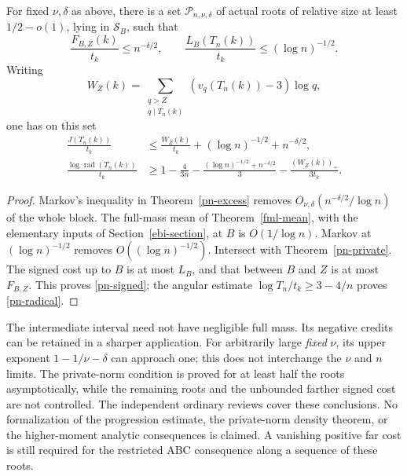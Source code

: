 \begin{corollary}\label{pn-domain}
For fixed \(\nu,\delta\) as above, there is a set
\(\mathcal{P}_{n,\nu,\delta}\) of actual roots of relative size at
least \(1/2-o(1)\), lying in \(\mathcal{S}_B\), such that
\[
 \frac{F_{B,Z}(k)}{t_k}\leq n^{-\delta/2},\qquad
 \frac{L_B(T_n(k))}{t_k}\leq(\log n)^{-1/2}.
\]
Writing
\[
 W_Z(k)=\sum_{\substack{q>Z\\q\mid T_n(k)}}
                         (v_q(T_n(k))-3)\log q,
\]
one has on this set
\begin{align}
 \frac{J(T_n(k))}{t_k}
   &\leq\frac{W_Z(k)}{t_k}+(\log n)^{-1/2}+n^{-\delta/2},
       \label{pn-signed}\\
 \frac{\log\operatorname{rad}(T_n(k))}{t_k}
   &\geq1-\frac4{3n}
       -\frac{(\log n)^{-1/2}+n^{-\delta/2}}3
       -\frac{(W_Z(k))_+}{3t_k}. \label{pn-radical}
\end{align}
\end{corollary}
\begin{proof}
Markov's inequality in Theorem~\ref{pn-excess} removes
\(O_{\nu,\delta}(n^{-\delta/2}/\log n)\) of the whole block.
The full-mass mean of Theorem~\ref{fml-mean}, with the elementary
inputs of Section~\ref{ebi-section}, at \(B\) is \(O(1/\log n)\).
Markov at \((\log n)^{-1/2}\) removes \(O((\log n)^{-1/2})\).
Intersect with Theorem~\ref{pn-private}.
The signed cost up to \(B\) is at most \(L_B\), and that between
\(B\) and \(Z\) is at most \(F_{B,Z}\).
This proves \eqref{pn-signed}; the angular estimate
\(\log T_n/t_k\geq3-4/n\) proves \eqref{pn-radical}.
\end{proof}

The intermediate interval need not have negligible full mass.
Its negative credits can be retained in a sharper application.
For arbitrarily large \emph{fixed} \(\nu\), its upper exponent
\(1-1/\nu-\delta\) can approach one; this does not interchange
the \(\nu\) and \(n\) limits. The private-norm condition is proved
for at least half the roots asymptotically, while the remaining
roots and the unbounded farther signed cost are not controlled.
The independent ordinary reviews cover these conclusions.
No formalization of the progression estimate, the private-norm
density theorem, or the higher-moment analytic consequences is
claimed. A vanishing positive far cost is still required for
the restricted ABC consequence along a sequence of these roots.
